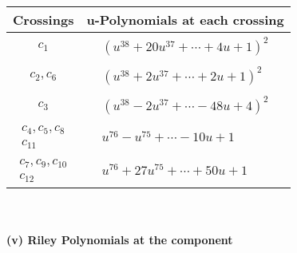 \documentclass[1p]{elsarticle_modified}
\theoremstyle{definition}
\begin{document}
\begin{tabular}{m{50pt}|m{274pt}}
Crossings & \hspace{64pt}u-Polynomials at each crossing \\
\hline $$\begin{aligned}c_{1}\end{aligned}$$&$\begin{aligned}
&(u^{38}+20 u^{37}+\cdots+4 u+1)^{2}
\end{aligned}$\\
\hline $$\begin{aligned}c_{2},c_{6}\end{aligned}$$&$\begin{aligned}
&(u^{38}+2 u^{37}+\cdots+2 u+1)^{2}
\end{aligned}$\\
\hline $$\begin{aligned}c_{3}\end{aligned}$$&$\begin{aligned}
&(u^{38}-2 u^{37}+\cdots-48 u+4)^{2}
\end{aligned}$\\
\hline $$\begin{aligned}c_{4},c_{5},c_{8}\\c_{11}\end{aligned}$$&$\begin{aligned}
&u^{76}- u^{75}+\cdots-10 u+1
\end{aligned}$\\
\hline $$\begin{aligned}c_{7},c_{9},c_{10}\\c_{12}\end{aligned}$$&$\begin{aligned}
&u^{76}+27 u^{75}+\cdots+50 u+1
\end{aligned}$\\
\hline
\end{tabular}\\~\\
\newpage\renewcommand{\arraystretch}{1}
\flushleft \textbf{(v) Riley Polynomials at the component}\newline \\
\end{document}
